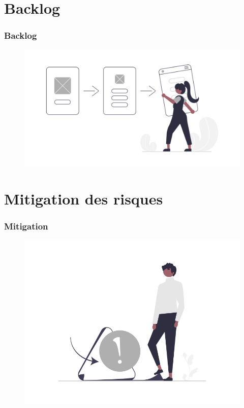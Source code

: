 \documentclass[9pt]{beamer}
\begin{document}
\section{Backlog}
\begin{frame}
	\frametitle{Backlog}
	\begin{figure}[!htb]
     \centering
     \includegraphics[width=.7\textwidth]{../media/User_flow}
   \label{Fig:user_flow}
\end{figure}
\end{frame}
\section{Mitigation des risques}
\begin{frame}
	\frametitle{Mitigation}
	\begin{figure}[!htb]
     \centering
     \includegraphics[width=.7\textwidth]{../media/Warning}
   \label{Fig:warning}
\end{figure}
\end{frame}
\end{document}
